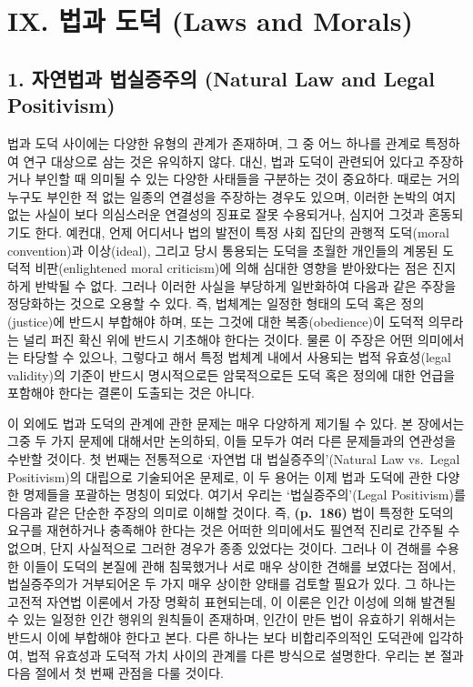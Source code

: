 \section{IX. 법과 도덕 (Laws and
Morals)}\label{ix.-uxbc95uxacfc-uxb3c4uxb355-laws-and-morals}

\subsection{1. 자연법과 법실증주의 (Natural Law and Legal
Positivism)}\label{uxc790uxc5f0uxbc95uxacfc-uxbc95uxc2e4uxc99duxc8fcuxc758-natural-law-and-legal-positivism}

법과 도덕 사이에는 다양한 유형의 관계가 존재하며, 그 중 어느 하나를
 관계로 특정하여 연구 대상으로 삼는 것은 유익하지
않다. 대신, 법과 도덕이 관련되어 있다고 주장하거나 부인할 때 의미될 수
있는 다양한 사태들을 구분하는 것이 중요하다. 때로는 거의 누구도 부인한
적 없는 일종의 연결성을 주장하는 경우도 있으며, 이러한 논박의 여지 없는
사실이 보다 의심스러운 연결성의 징표로 잘못 수용되거나, 심지어 그것과
혼동되기도 한다. 예컨대, 언제 어디서나 법의 발전이 특정 사회 집단의
관행적 도덕(moral convention)과 이상(ideal), 그리고 당시 통용되는 도덕을
초월한 개인들의 계몽된 도덕적 비판(enlightened moral criticism)에 의해
심대한 영향을 받아왔다는 점은 진지하게 반박될 수 없다. 그러나 이러한
사실을 부당하게 일반화하여 다음과 같은 주장을 정당화하는 것으로 오용할
수 있다. 즉, 법체계는 일정한 형태의 도덕 혹은 정의(justice)에 반드시
부합해야 하며, 또는 그것에 대한 복종(obedience)이 도덕적 의무라는 널리
퍼진 확신 위에 반드시 기초해야 한다는 것이다. 물론 이 주장은 어떤
의미에서는 타당할 수 있으나, 그렇다고 해서 특정 법체계 내에서 사용되는
법적 유효성(legal validity)의 기준이 반드시 명시적으로든 암묵적으로든
도덕 혹은 정의에 대한 언급을 포함해야 한다는 결론이 도출되는 것은
아니다.

이 외에도 법과 도덕의 관계에 관한 문제는 매우 다양하게 제기될 수 있다.
본 장에서는 그중 두 가지 문제에 대해서만 논의하되, 이들 모두가 여러 다른
문제들과의 연관성을 수반할 것이다. 첫 번째는 전통적으로 `자연법 대
법실증주의'(Natural Law vs.~Legal Positivism)의 대립으로 기술되어온
문제로, 이 두 용어는 이제 법과 도덕에 관한 다양한 명제들을 포괄하는
명칭이 되었다. 여기서 우리는 `법실증주의'(Legal Positivism)를 다음과
같은 단순한 주장의 의미로 이해할 것이다. 즉, \textbf{(p.~186)} 법이
특정한 도덕의 요구를 재현하거나 충족해야 한다는 것은 어떠한 의미에서도
필연적 진리로 간주될 수 없으며, 단지 사실적으로 그러한 경우가 종종
있었다는 것이다. 그러나 이 견해를 수용한 이들이 도덕의 본질에 관해
침묵했거나 서로 매우 상이한 견해를 보였다는 점에서, 법실증주의가
거부되어온 두 가지 매우 상이한 양태를 검토할 필요가 있다. 그 하나는
고전적 자연법 이론에서 가장 명확히 표현되는데, 이 이론은 인간 이성에
의해 발견될 수 있는 일정한 인간 행위의 원칙들이 존재하며, 인간이 만든
법이 유효하기 위해서는 반드시 이에 부합해야 한다고 본다. 다른 하나는
보다 비합리주의적인 도덕관에 입각하여, 법적 유효성과 도덕적 가치 사이의
관계를 다른 방식으로 설명한다. 우리는 본 절과 다음 절에서 첫 번째 관점을
다룰 것이다.

